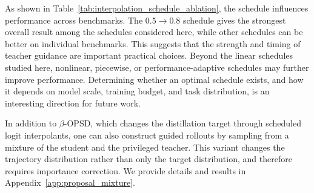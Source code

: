 As shown in Table~\ref{tab:interpolation_schedule_ablation}, the schedule influences
performance across benchmarks. The $0.5\rightarrow0.8$ schedule gives the strongest
overall result among the schedules considered here, while other schedules can be better on
individual benchmarks. This suggests that the strength and timing of teacher guidance are
important practical choices. Beyond the linear schedules studied here, nonlinear,
piecewise, or performance-adaptive schedules may further improve performance. Determining
whether an optimal schedule exists, and how it depends on model scale, training budget,
and task distribution, is an interesting direction for future work.



\begin{remark}
In addition to $\beta$-OPSD, which changes the distillation target through scheduled
logit interpolants, one can also construct guided rollouts by sampling from a mixture of the
student and the privileged teacher. This variant changes the trajectory distribution rather
than only the target distribution, and therefore requires importance correction. We provide
details and results in Appendix~\ref{app:proposal_mixture}.
\end{remark}